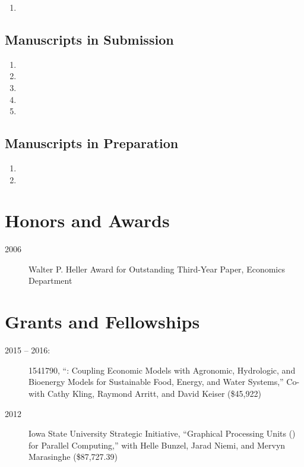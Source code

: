 \documentclass[12pt]{article}%
\newcommand{\allcaps}[1]{\textls{\MakeUppercase{#1}}}
\begin{document}
\begin{enumerate}
\item {}
\end{enumerate}

\subsection*{Manuscripts in Submission}

\begin{enumerate}
\item {}
\item {}
\item {}
\item {}
\item {}
\end{enumerate}

\subsection*{Manuscripts in Preparation}
\begin{enumerate}
\item {}
\item {}
\end{enumerate}

\section*{Honors and Awards}

\begin{description}
\item[2006] Walter P. Heller Award for Outstanding Third-Year Paper,
\allcaps{UCSD} Economics Department
\end{description}

\section*{Grants and Fellowships}

\begin{description}
\item[2015 -- 2016:] \allcaps{NSF} 1541790, ``\allcaps{FEW}: Coupling
  Economic Models with Agronomic, Hydrologic, and Bioenergy Models for
  Sustainable Food, Energy, and Water Systems,'' Co-\allcaps{PI} with
  Cathy Kling, Raymond Arritt, and David Keiser (\$45,922)
\item[2012] Iowa State University Strategic Initiative, ``Graphical
  Processing Units (\allcaps{GPU}) for Parallel Computing,'' with
  Helle Bunzel, Jarad Niemi, and Mervyn Marasinghe (\$87,727.39)
\end{description}
\end{document}
